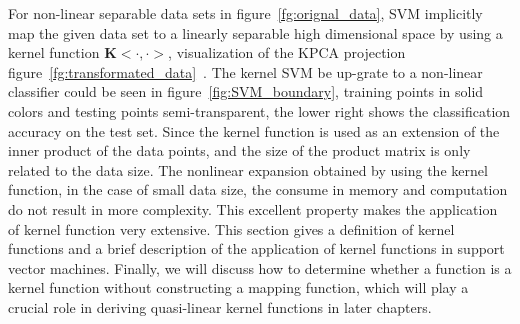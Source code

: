 \documentclass[master]{IPSstyle}
\begin{document}
For non-linear separable data sets in figure~\ref{fg:orignal_data}, SVM implicitly map the given data set to a linearly separable high dimensional space by using a kernel function $\mathbf{K}<\cdot, \cdot>$, visualization of the KPCA projection figure~\ref{fg:transformated_data}~\cite{jolliffe2002principal}. The kernel SVM be up-grate to a non-linear classifier could be seen in figure~\ref{fig:SVM_boundary}, training points in solid colors and testing points semi-transparent, the lower right shows the classification accuracy on the test set. Since the kernel function is used as an extension of the inner product of the data points, and the size of the product matrix is only related to the data size. The nonlinear expansion obtained by using the kernel function, in the case of small data size, the consume in memory and computation do not result in more complexity. This excellent property makes the application of kernel function very extensive. This section gives a definition of kernel functions and a brief description of the application of kernel functions in support vector machines. Finally, we will discuss how to determine whether a function is a kernel function without constructing a mapping function, which will play a crucial role in deriving quasi-linear kernel functions in later chapters.
\end{document}
